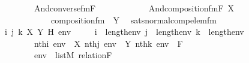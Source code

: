 \begin{isabellebody}
\ \ \ \ \ \ \ \ \ \ And{\isacharparenleft}{\kern0pt}converse{\isacharunderscore}{\kern0pt}fm{\isacharparenleft}{\kern0pt}F{\isacharhash}{\kern0pt}{\isacharplus}{\kern0pt}{}{\isacharcomma}{\kern0pt}\ {}{\isacharparenright}{\kern0pt}{\isacharcomma}{\kern0pt}\ \isanewline
\ \ \ \ \ \ \ \ \ \ And{\isacharparenleft}{\kern0pt}composition{\isacharunderscore}{\kern0pt}fm{\isacharparenleft}{\kern0pt}F{\isacharhash}{\kern0pt}{\isacharplus}{\kern0pt}{}{\isacharcomma}{\kern0pt}\ X{\isacharhash}{\kern0pt}{\isacharplus}{\kern0pt}{}{\isacharcomma}{\kern0pt}\ {}{\isacharparenright}{\kern0pt}{\isacharcomma}{\kern0pt}\ \isanewline
\ \ \ \ \ \ \ \ \ \ \ \ \ \ composition{\isacharunderscore}{\kern0pt}fm{\isacharparenleft}{\kern0pt}{}{\isacharcomma}{\kern0pt}\ {}{\isacharcomma}{\kern0pt}\ Y{\isacharhash}{\kern0pt}{\isacharplus}{\kern0pt}{}{\isacharparenright}{\kern0pt}{\isacharparenright}{\kern0pt}{\isacharparenright}{\kern0pt}{\isacharparenright}{\kern0pt}{\isacharparenright}{\kern0pt}{\isachardoublequoteclose}\ \isanewline
\isanewline
{}\isamarkupfalse%
\ sats{\isacharunderscore}{\kern0pt}normal{\isacharunderscore}{\kern0pt}comp{\isacharunderscore}{\kern0pt}elem{\isacharunderscore}{\kern0pt}fm\ {\isacharcolon}{\kern0pt}\ \isanewline
\ \ \ i\ j\ k\ X\ Y\ H\ env\ \ \isanewline
\ \ \ {\isachardoublequoteopen}i\ {\isacharless}{\kern0pt}\ length{\isacharparenleft}{\kern0pt}env{\isacharparenright}{\kern0pt}{\isachardoublequoteclose}\ {\isachardoublequoteopen}j\ {\isacharless}{\kern0pt}\ length{\isacharparenleft}{\kern0pt}env{\isacharparenright}{\kern0pt}{\isachardoublequoteclose}\ {\isachardoublequoteopen}k\ {\isacharless}{\kern0pt}\ length{\isacharparenleft}{\kern0pt}env{\isacharparenright}{\kern0pt}{\isachardoublequoteclose}\ \isanewline
\ \ \ \ \ \ \ \ \ \ {\isachardoublequoteopen}nth{\isacharparenleft}{\kern0pt}i{\isacharcomma}{\kern0pt}\ env{\isacharparenright}{\kern0pt}\ {\isacharequal}{\kern0pt}\ X{\isachardoublequoteclose}\ {\isachardoublequoteopen}nth{\isacharparenleft}{\kern0pt}j{\isacharcomma}{\kern0pt}\ env{\isacharparenright}{\kern0pt}\ {\isacharequal}{\kern0pt}\ Y{\isachardoublequoteclose}\ {\isachardoublequoteopen}nth{\isacharparenleft}{\kern0pt}k{\isacharcomma}{\kern0pt}\ env{\isacharparenright}{\kern0pt}\ {\isacharequal}{\kern0pt}\ F{\isachardoublequoteclose}\ \isanewline
\ \ \ \ \ \ \ \ \ \ {\isachardoublequoteopen}env\ {\isasymin}\ list{\isacharparenleft}{\kern0pt}M{\isacharparenright}{\kern0pt}{\isachardoublequoteclose}\ {\isachardoublequoteopen}relation{\isacharparenleft}{\kern0pt}F{\isacharparenright}{\kern0pt}{\isachardoublequoteclose}\ \isanewline

\end{isabellebody}
